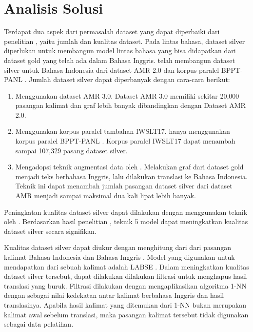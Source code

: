 \section{Analisis Solusi}

Terdapat dua aspek dari permasalah dataset yang dapat diperbaiki dari penelitian \textcite{putra2022}, yaitu jumlah dan kualitas dataset.
Pada \amrparsing{} lintas bahasa, dataset silver diperlukan untuk membangun model \amrparsing{} lintas bahasa yang bisa didapatkan dari dataset gold yang telah ada dalam Bahasa Inggris.
\textcite{putra2022} telah membangun dataset silver untuk Bahasa Indonesia dari dataset AMR 2.0 dan korpus paralel BPPT-PANL .
Jumlah dataset silver dapat diperbanyak dengan cara-cara berikut:
\begin{enumerate}
  \item Menggunakan dataset AMR 3.0.
  Dataset AMR 3.0 memiliki sekitar 20,000 pasangan kalimat dan graf \AMR{} lebih banyak dibandingkan dengan Dataset AMR 2.0.

  \item Menggunakan korpus paralel tambahan IWSLT17.
  \textcite{putra2022} hanya menggunakan korpus paralel BPPT-PANL .
  Korpus paralel IWSLT17  dapat menambah sampai 107,329 pasang dataset silver.

  \item Mengadopsi teknik augmentasi data oleh \textcite{lee2022}.
  Melakukan  graf \AMR{} dari dataset gold menjadi teks berbahasa Inggris, lalu dilakukan translasi ke Bahasa Indonesia.
  Teknik ini dapat menambah jumlah pasangan dataset silver dari dataset AMR menjadi sampai maksimal dua kali lipat lebih banyak.
\end{enumerate}

Peningkatan kualitas dataset silver dapat dilakukan dengan menggunakan teknik  oleh \textcite{hoang2021}.
Berdasarkan hasil penelitian \textcite{lee2022}, teknik  5 model \amrparser{} dapat meningkatkan kualitas dataset silver secara signifikan.

Kualitas dataset silver dapat diukur dengan menghitung \cossim{} dari \multil{}  dari pasangan kalimat Bahasa Indonesia dan Bahasa Inggris .
Model \mwordem{} yang digunakan untuk mendapatkan \multil{}  dari sebuah kalimat adalah \gls{LABSE} .
Dalam meningkatkan kualitas dataset silver tersebut, dapat dilakukan dilakukan filtrasi untuk menghapus hasil translasi yang buruk.
Filtrasi dilakukan dengan mengaplikasikan algoritma \gls{1-NN} dengan \cossim{} sebagai nilai kedekatan antar kalimat berbahasa Inggris dan hasil translasinya.
Apabila hasil kalimat yang ditemukan dari \gls{1-NN} bukan merupakan kalimat awal sebelum translasi, maka pasangan kalimat tersebut tidak digunakan sebagai data pelatihan.

